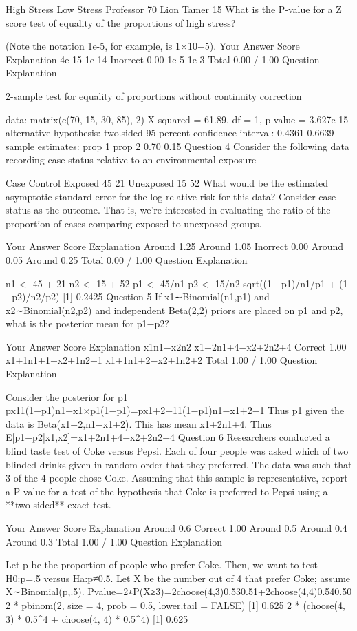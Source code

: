 High Stress	Low Stress
Professor	70
Lion Tamer	15
What is the P-value for a Z score test of equality of the proportions of high stress?

(Note the notation 1e-5, for example, is 1×10−5).
Your Answer		Score	Explanation
4e-15			
1e-14	Inorrect	0.00	
1e-5			
1e-3			
Total		0.00 / 1.00	
Question Explanation


    2-sample test for equality of proportions without continuity
    correction

data:  matrix(c(70, 15, 30, 85), 2) 
X-squared = 61.89, df = 1, p-value = 3.627e-15
alternative hypothesis: two.sided 
95 percent confidence interval:
 0.4361 0.6639 
sample estimates:
prop 1 prop 2 
  0.70   0.15 
Question 4
Consider the following data recording case status relative to an environmental exposure

Case	Control
Exposed	45	21
Unexposed	15	52
What would be the estimated asymptotic standard error for the log relative risk for this data? Consider case status as the outcome. That is, we're interested in evaluating the ratio of the proportion of cases comparing exposed to unexposed groups.

Your Answer		Score	Explanation
Around 1.25			
Around 1.05	Inorrect	0.00	
Around 0.05			
Around 0.25			
Total		0.00 / 1.00	
Question Explanation

n1 <- 45 + 21
n2 <- 15 + 52
p1 <- 45/n1
p2 <- 15/n2
sqrt((1 - p1)/n1/p1 + (1 - p2)/n2/p2)
[1] 0.2425
Question 5
If x1∼Binomial(n1,p1) and x2∼Binomial(n2,p2) and independent Beta(2,2) priors are placed on p1 and p2, what is the posterior mean for p1−p2?

Your Answer		Score	Explanation
x1n1−x2n2			
x1+2n1+4−x2+2n2+4	Correct	1.00	
x1+1n1+1−x2+1n2+1			
x1+1n1+2−x2+1n2+2			
Total		1.00 / 1.00	
Question Explanation

Consider the posterior for p1
px11(1−p1)n1−x1×p1(1−p1)=px1+2−11(1−p1)n1−x1+2−1
Thus p1 given the data is Beta(x1+2,n1−x1+2). This has mean x1+2n1+4. Thus
E[p1−p2|x1,x2]=x1+2n1+4−x2+2n2+4
Question 6
Researchers conducted a blind taste test of Coke versus Pepsi. Each of four people was asked which of two blinded drinks given in random order that they preferred. The data was such that 3 of the 4 people chose Coke. Assuming that this sample is representative, report a P-value for a test of the hypothesis that Coke is preferred to Pepsi using a **two sided** exact test.

Your Answer		Score	Explanation
Around 0.6	Correct	1.00	
Around 0.5			
Around 0.4			
Around 0.3			
Total		1.00 / 1.00	
Question Explanation

Let p be the proportion of people who prefer Coke. Then, we want to test H0:p=.5 versus Ha:p≠0.5. Let X be the number out of 4 that prefer Coke; assume X∼Binomial(p,.5). Pvalue=2∗P(X≥3)=2choose(4,3)0.530.51+2choose(4,4)0.540.50
2 * pbinom(2, size = 4, prob = 0.5, lower.tail = FALSE)
[1] 0.625
2 * (choose(4, 3) * 0.5^4 + choose(4, 4) * 0.5^4)
[1] 0.625
